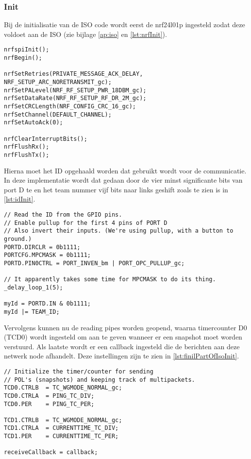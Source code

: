     \subsubsection{Init}
        Bij de initialisatie van de ISO code wordt eerst de nrf24l01p ingesteld zodat deze voldoet aan de ISO (zie bijlage \ref{ap:iso} en \autoref{lst:nrfInit}). 
\begin{lstlisting}[caption={nrf init},captionpos=b,label={lst:nrfInit},style=c]
nrfspiInit();
nrfBegin();

nrfSetRetries(PRIVATE_MESSAGE_ACK_DELAY, NRF_SETUP_ARC_NORETRANSMIT_gc);
nrfSetPALevel(NRF_RF_SETUP_PWR_18DBM_gc);
nrfSetDataRate(NRF_RF_SETUP_RF_DR_2M_gc);
nrfSetCRCLength(NRF_CONFIG_CRC_16_gc);
nrfSetChannel(DEFAULT_CHANNEL);
nrfSetAutoAck(0);

nrfClearInterruptBits();
nrfFlushRx();
nrfFlushTx();
\end{lstlisting}
        Hierna moet het ID opgehaald worden dat gebruikt wordt voor de communicatie. In deze implementatie wordt dat gedaan door de vier minst significante bits van port D te en het team nummer vijf bits naar links geshift zoals te zien is in \autoref{lst:idInit}.
\begin{lstlisting}[caption={ID init},captionpos=b,label={lst:idInit},style=c]
// Read the ID from the GPIO pins.
// Enable pullup for the first 4 pins of PORT D
// Also invert their inputs. (We're using pullup, with a button to ground.)
PORTD.DIRCLR = 0b1111;
PORTCFG.MPCMASK = 0b1111; 
PORTD.PIN0CTRL = PORT_INVEN_bm | PORT_OPC_PULLUP_gc;

// It apparently takes some time for MPCMASK to do its thing.
_delay_loop_1(5);

myId = PORTD.IN & 0b1111;
myId |= TEAM_ID;
\end{lstlisting}
        Vervolgens kunnen nu de reading pipes worden geopend, waarna timercounter D0 (TCD0) wordt ingesteld om aan te geven wanneer er een snapshot moet worden verstuurd. Als laatste wordt er een callback ingesteld die de berichten aan deze netwerk node afhandelt. Deze instellingen zijn te zien in \autoref{lst:finilPartOfIsoInit}.
\begin{lstlisting}[caption={Laatste instellingen},captionpos=b,label={lst:finilPartOfIsoInit},style=c]
// Initialize the timer/counter for sending
// POL's (snapshots) and keeping track of multipackets.
TCD0.CTRLB  = TC_WGMODE_NORMAL_gc;
TCD0.CTRLA  = PING_TC_DIV;
TCD0.PER    = PING_TC_PER;

TCD1.CTRLB  = TC_WGMODE_NORMAL_gc;
TCD1.CTRLA  = CURRENTTIME_TC_DIV;
TCD1.PER    = CURRENTTIME_TC_PER;

receiveCallback = callback;
\end{lstlisting}

